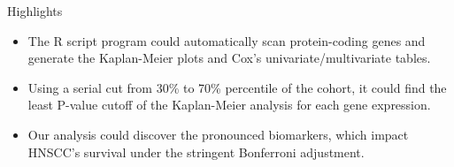 \documentclass[preprint,12pt]{elsarticle}
\begin{document}
  
Highlights
\begin{itemize}
    \item The R script program could automatically scan protein-coding genes and generate the Kaplan-Meier plots and Cox's univariate/multivariate tables.
    \item Using a serial cut from 30\% to 70\% percentile of the cohort, it could find the least P-value cutoff of the Kaplan-Meier analysis for each gene expression.
    \item Our analysis could discover the pronounced biomarkers, which impact HNSCC's survival under the stringent Bonferroni adjustment.
\end{itemize}
\end{document}
